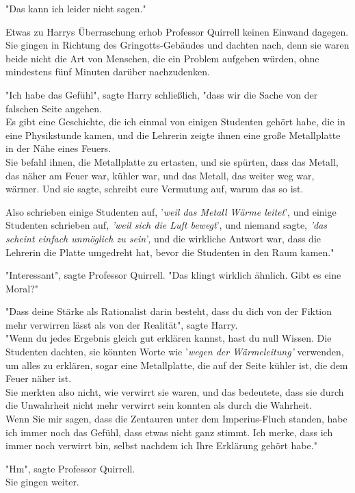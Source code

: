 {"Das kann ich leider nicht sagen."

Etwas zu Harrys Überraschung erhob Professor Quirrell keinen Einwand dagegen.\\ Sie gingen in Richtung des Gringotts-Gebäudes und dachten nach, denn sie waren beide nicht die Art von Menschen, die ein Problem aufgeben würden, ohne mindestens fünf Minuten darüber nachzudenken.

"Ich habe das Gefühl", sagte Harry schließlich, "dass wir die Sache von der falschen Seite angehen.\\ Es gibt eine Geschichte, die ich einmal von einigen Studenten gehört habe, die in eine Physikstunde kamen, und die Lehrerin zeigte ihnen eine große Metallplatte in der Nähe eines Feuers.\\ Sie befahl ihnen, die Metallplatte zu ertasten, und sie spürten, dass das Metall, das näher am Feuer war, kühler war, und das Metall, das weiter weg war, wärmer. Und sie sagte, schreibt eure Vermutung auf, warum das so ist.

Also schrieben einige Studenten auf, '\emph{weil das Metall Wärme leitet}', und einige Studenten schrieben auf, \emph{'weil sich die Luft bewegt}', und niemand sagte, \emph{'das scheint einfach unmöglich zu sein',} und die wirkliche Antwort war, dass die Lehrerin die Platte umgedreht hat, bevor die Studenten in den Raum kamen."

"Interessant", sagte Professor Quirrell. "Das klingt wirklich ähnlich. Gibt es eine Moral?"

"Dass deine Stärke als Rationalist darin besteht, dass du dich von der Fiktion mehr verwirren lässt als von der Realität", sagte Harry.\\ "Wenn du jedes Ergebnis gleich gut erklären kannst, hast du null Wissen. Die Studenten dachten, sie könnten Worte wie '\emph{wegen der Wärmeleitung'} verwenden, um alles zu erklären, sogar eine Metallplatte, die auf der Seite kühler ist, die dem Feuer näher ist.\\ Sie merkten also nicht, wie verwirrt sie waren, und das bedeutete, dass sie durch die Unwahrheit nicht mehr verwirrt sein konnten als durch die Wahrheit.\\ Wenn Sie mir sagen, dass die Zentauren unter dem Imperius-Fluch standen, habe ich immer noch das Gefühl, dass etwas nicht ganz stimmt. Ich merke, dass ich immer noch verwirrt bin, selbst nachdem ich Ihre Erklärung gehört habe."

"Hm", sagte Professor Quirrell.\\ Sie gingen weiter.

}
